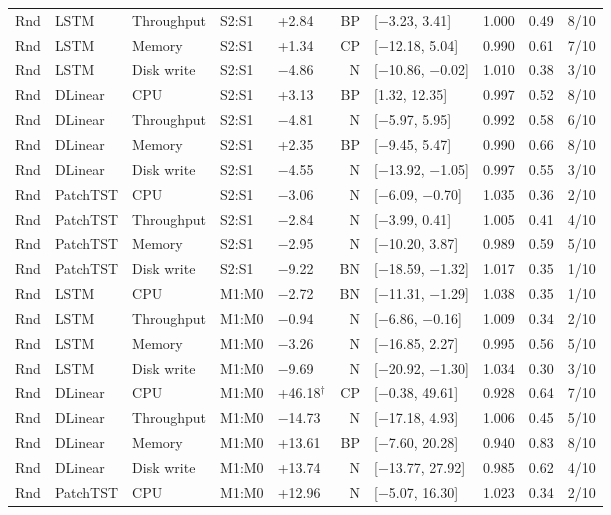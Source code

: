 \documentclass[a4paper,11pt]{article}
\begin{document}
\begin{longtable}{@{}lllllrlrrr@{}}
Rnd & LSTM & Throughput & S2:S1 & +2.84 & BP & [$-$3.23, 3.41] & 1.000 & 0.49 & 8/10 \\
Rnd & LSTM & Memory & S2:S1 & +1.34 & CP & [$-$12.18, 5.04] & 0.990 & 0.61 & 7/10 \\
Rnd & LSTM & Disk write & S2:S1 & $-$4.86 & N & [$-$10.86, $-$0.02] & 1.010 & 0.38 & 3/10 \\
Rnd & DLinear & CPU & S2:S1 & +3.13 & BP & [1.32, 12.35] & 0.997 & 0.52 & 8/10 \\
Rnd & DLinear & Throughput & S2:S1 & $-$4.81 & N & [$-$5.97, 5.95] & 0.992 & 0.58 & 6/10 \\
Rnd & DLinear & Memory & S2:S1 & +2.35 & BP & [$-$9.45, 5.47] & 0.990 & 0.66 & 8/10 \\
Rnd & DLinear & Disk write & S2:S1 & $-$4.55 & N & [$-$13.92, $-$1.05] & 0.997 & 0.55 & 3/10 \\
Rnd & PatchTST & CPU & S2:S1 & $-$3.06 & N & [$-$6.09, $-$0.70] & 1.035 & 0.36 & 2/10 \\
Rnd & PatchTST & Throughput & S2:S1 & $-$2.84 & N & [$-$3.99, 0.41] & 1.005 & 0.41 & 4/10 \\
Rnd & PatchTST & Memory & S2:S1 & $-$2.95 & N & [$-$10.20, 3.87] & 0.989 & 0.59 & 5/10 \\
Rnd & PatchTST & Disk write & S2:S1 & $-$9.22 & BN & [$-$18.59, $-$1.32] & 1.017 & 0.35 & 1/10 \\
Rnd & LSTM & CPU & M1:M0 & $-$2.72 & BN & [$-$11.31, $-$1.29] & 1.038 & 0.35 & 1/10 \\
Rnd & LSTM & Throughput & M1:M0 & $-$0.94 & N & [$-$6.86, $-$0.16] & 1.009 & 0.34 & 2/10 \\
Rnd & LSTM & Memory & M1:M0 & $-$3.26 & N & [$-$16.85, 2.27] & 0.995 & 0.56 & 5/10 \\
Rnd & LSTM & Disk write & M1:M0 & $-$9.69 & N & [$-$20.92, $-$1.30] & 1.034 & 0.30 & 3/10 \\
Rnd & DLinear & CPU & M1:M0 & +46.18$^{\dagger}$ & CP & [$-$0.38, 49.61] & 0.928 & 0.64 & 7/10 \\
Rnd & DLinear & Throughput & M1:M0 & $-$14.73 & N & [$-$17.18, 4.93] & 1.006 & 0.45 & 5/10 \\
Rnd & DLinear & Memory & M1:M0 & +13.61 & BP & [$-$7.60, 20.28] & 0.940 & 0.83 & 8/10 \\
Rnd & DLinear & Disk write & M1:M0 & +13.74 & N & [$-$13.77, 27.92] & 0.985 & 0.62 & 4/10 \\
Rnd & PatchTST & CPU & M1:M0 & +12.96 & N & [$-$5.07, 16.30] & 1.023 & 0.34 & 2/10 \\

\end{longtable}
\end{document}
